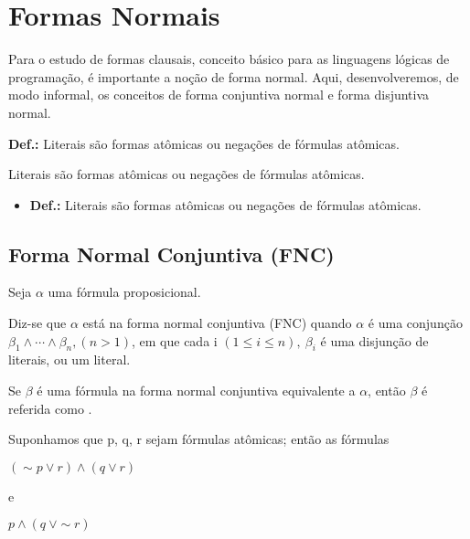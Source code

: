 \newpage

\newpage

\section{Formas Normais}
Para o estudo de formas clausais, conceito básico para as linguagens lógicas de programação, é importante a noção de forma normal.
Aqui, desenvolveremos, de modo informal, os conceitos de forma conjuntiva normal e forma disjuntiva normal.

\bigskip
\noindent
\textbf{Def.:} Literais são formas atômicas ou negações de fórmulas atômicas.

\begin{defi}
Literais são formas atômicas ou negações de fórmulas atômicas.
\end{defi}

\begin{itemize}[label={},itemindent=-3em,leftmargin=\parindent]
    \item \textbf{Def.:} Literais são formas atômicas ou negações de fórmulas atômicas.
\end{itemize}

\subsection{Forma Normal Conjuntiva (FNC)}

Seja $\alpha$ uma fórmula proposicional.

\begin{defi}
    Diz-se que $\alpha$ está na forma normal conjuntiva (FNC) quando $\alpha$ é uma conjunção $\beta_1 \land \cdots \land \beta_n, (n > 1)$, em que cada i $(1 \leq i \leq n),\ \beta_i$ é uma disjunção de literais, ou um literal.
\end{defi}

\begin{defi}
    Se $\beta$ é uma fórmula na forma normal conjuntiva equivalente a $\alpha$, então $\beta$ é referida como .
\end{defi}

\setcounter{exemplo}{0}
\begin{exemplo}
    Suponhamos que p, q, r sejam fórmulas atômicas; então as fórmulas
    \begin{center}
        $(\sim p \lor r) \land (q \lor r)$

        e

        $p \land (q\ \lor \sim r)$
    \end{center}
\end{exemplo}

